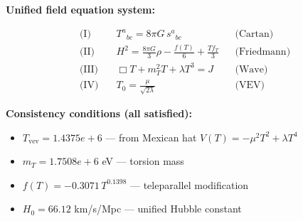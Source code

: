 
\textbf{Unified field equation system:}

\begin{align}
  \text{(I)} \quad & T^a{}_{bc} = 8\pi G \, s^a{}_{bc} && \text{(Cartan)} \\
  \text{(II)} \quad & H^2 = \frac{8\pi G}{3}\rho - \frac{f(T)}{6} + \frac{Tf_T}{3} && \text{(Friedmann)} \\
  \text{(III)} \quad & \Box T + m_T^2 T + \lambda T^3 = J && \text{(Wave)} \\
  \text{(IV)} \quad & T_0 = \frac{\mu}{\sqrt{2\lambda}} && \text{(VEV)}
\end{align}

\textbf{Consistency conditions (all satisfied):}
\begin{itemize}
  \item $T_{\text{vev}} = 1.4375e+6$ — from Mexican hat $V(T) = -\mu^2 T^2 + \lambda T^4$
  \item $m_T = 1.7508e+6$ eV — torsion mass
  \item $f(T) = -0.3071 \, T^{0.1398}$ — teleparallel modification
  \item $H_0 = 66.12$ km/s/Mpc — unified Hubble constant
\end{itemize}